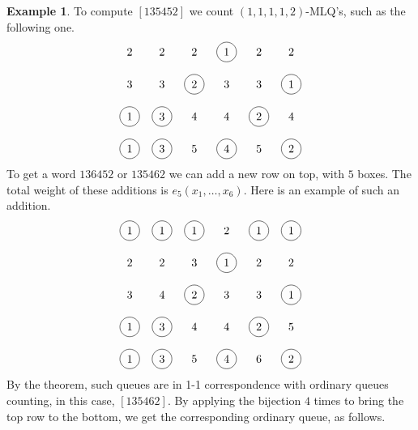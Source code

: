 \documentclass[reqno]{amsart}
\newcommand{\0}{\phantom{c}}
\theoremstyle{plain}
\theoremstyle{definition}
\newtheorem{example}[thm]{Example}
\numberwithin{equation}{section}
\begin{document}
\begin{example}
To compute $[135452]$ we count $(1,1,1,1,2)$-MLQ's, such as the following one.
\[
\begin{tikzpicture}\node at (0, 4){2};\node at (1, 4){2};\node at (2, 4){2};\node[circle, draw=black] at (3, 4){1};\node at (4, 4){2};\node at (5, 4){2};\node at (0, 3){3};\node at (1, 3){3};\node[circle, draw=black] at (2, 3){2};\node at (3, 3){3};\node at (4, 3){3};\node[circle, draw=black] at (5, 3){1};\node[circle, draw=black] at (0, 2){1};\node[circle, draw=black] at (1, 2){3};\node at (2, 2){4};\node at (3, 2){4};\node[circle, draw=black] at (4, 2){2};\node at (5, 2){4};\node[circle, draw=black] at (0, 1){1};\node[circle, draw=black] at (1, 1){3};\node at (2, 1){5};\node[circle, draw=black] at (3, 1){4};\node at (4, 1){5};\node[circle, draw=black] at (5, 1){2};\end{tikzpicture}
\]
To get a word $136452$ or $135462$ we can add a new row on top, with $5$ boxes. The total weight of these additions is $e_5(x_1, \dots, x_6)$. Here is an example of such an addition.
\[
\begin{tikzpicture}\node[circle, draw=black] at (0, 5){1};\node[circle, draw=black] at (1, 5){1};\node[circle, draw=black] at (2, 5){1};\node at (3, 5){2};\node[circle, draw=black] at (4, 5){1};\node[circle, draw=black] at (5, 5){1};\node at (0, 4){2};\node at (1, 4){2};\node at (2, 4){3};\node[circle, draw=black] at (3, 4){1};\node at (4, 4){2};\node at (5, 4){2};\node at (0, 3){3};\node at (1, 3){4};\node[circle, draw=black] at (2, 3){2};\node at (3, 3){3};\node at (4, 3){3};\node[circle, draw=black] at (5, 3){1};\node[circle, draw=black] at (0, 2){1};\node[circle, draw=black] at (1, 2){3};\node at (2, 2){4};\node at (3, 2){4};\node[circle, draw=black] at (4, 2){2};\node at (5, 2){5};\node[circle, draw=black] at (0, 1){1};\node[circle, draw=black] at (1, 1){3};\node at (2, 1){5};\node[circle, draw=black] at (3, 1){4};\node at (4, 1){6};\node[circle, draw=black] at (5, 1){2};\end{tikzpicture}
\]
By the theorem, such queues are in 1-1 correspondence with ordinary queues counting, in this case, $[135462]$. By applying the bijection $4$ times to bring the top row to the bottom, we get the corresponding ordinary queue, as follows.\\


\end{example}
\end{document}
